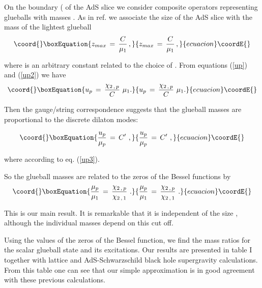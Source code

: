 \documentclass[a4paper,twocolumn,prl,groupedaddress,nofootinbib,showpacs]{revtex4}
\begin{document}
 On the boundary (\coordHE{} of the AdS slice we consider composite 
operators representing glueballs with masses \coordHE{}. 
As in ref. \cite{PS} we associate the size \coordHE{} of the AdS slice 
with the mass of the lightest glueball  \coordHE{}  
\begin{equation}\coord{}\boxEquation{
\label{up2}
z_{max} \,=\, { C \over \mu_1}\,,
}{
z_{max} \,=\, { C \over \mu_1}\,,
}{ecuacion}\coordE{}\end{equation}
 

\noindent where \coordHE{} is an arbitrary constant related to the choice of  
\coordHE{}. From equations (\ref{up}) and (\ref{up2}) we have 
\begin{equation}\coord{}\boxEquation{
\label{up3}
u_p \,=\,{\chi_{2\,,\,p}\over C} \,\, \mu_1 .
}{
u_p \,=\,{\chi_{2\,,\,p}\over C} \,\, \mu_1 .
}{ecuacion}\coordE{}\end{equation} 


Then the gauge/string correspondence suggests that the glueball masses
are proportional to the discrete dilaton modes: 

\begin{equation}\coord{}\boxEquation{
{u_p \over \mu_p }\,=\,C^\prime\,\,, 
}{
{u_p \over \mu_p }\,=\,C^\prime\,\,, 
}{ecuacion}\coordE{}\end{equation}
 
\noindent 
where \coordHE{} according to eq. (\ref{up3}).

So the glueball masses are related to the zeros of the Bessel
functions by
\begin{equation}\coord{}\boxEquation{
\label{QCD4}
{ \mu_p\over \mu_1 }\,=\,{\chi_{2\,,\,p}\over \chi_{2\,,\,1}}\,\,.
}{
{ \mu_p\over \mu_1 }\,=\,{\chi_{2\,,\,p}\over \chi_{2\,,\,1}}\,\,.
}{ecuacion}\coordE{}\end{equation}

\noindent This is our main result. It is remarkable that it is
independent of the size \coordHE{}, although the individual masses
depend on this cut off. 
 
Using the values of the zeros of the Bessel function, 
we find the mass ratios for the scalar glueball state 
\coordHE{} and its excitations. 
Our results are presented in table I together with lattice
\cite{LAT1,LAT2} and AdS-Schwarzschild black hole supergravity
\cite{MASSG} calculations. 
From this table one can see that our simple approximation is in good 
agreement with these previous calculations.
\end{document}
